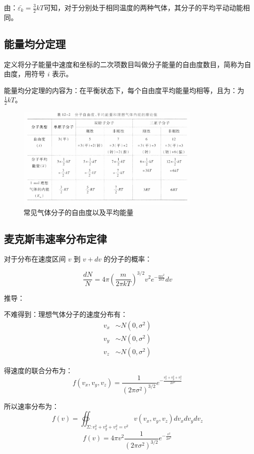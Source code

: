 \documentclass[10pt]{ctexart}
\begin{document}
由：$\bar{\varepsilon_k} = \frac{3}{2} k T$可知，对于分别处于相同温度的两种气体，其分子的平均平动动能相同。

\subsection{能量均分定理}

定义将分子能量中速度和坐标的二次项数目叫做分子能量的自由度数目，简称为自由度，用符号 $i$ 表示。

能量均分定理的内容为：在平衡状态下，每个自由度平均能量均相等，且为：为 $\frac{1}{2} k T$。

\begin{figure}[H]
    \centering
    \includegraphics[width=0.8\textwidth]{img/12/2.png}
    \caption{常见气体分子的自由度以及平均能量}
\end{figure}

\subsection{麦克斯韦速率分布定律}

对于分布在速度区间 $v$ 到 $v + d v$ 的分子的概率：

$$
    \frac{d N}{N} = 4 \pi \left( \frac{m}{2 \pi k T} \right)^{3/2} v^2 e^{-\frac{m v^2}{2 k T}} d v
$$

推导：

不难得到：理想气体分子的速度分布有：
\begin{align*}
    v_x &\sim N(0, \sigma^2) \\
    v_y &\sim N(0, \sigma^2) \\
    v_z &\sim N(0, \sigma^2)
\end{align*}

得速度的联合分布为：
$$
    f(v_x,v_y,v_z) = \frac{1}{(2 \pi \sigma^2)^{3/2}} e^{-\frac{v_x^2 + v_y^2 + v_z^2}{2 \sigma^2}}
$$

所以速率分布为：
$$
    f(v) = \oiint_{\Sigma:v_x^2 + v_y^2 + v_z^2 = v^2} v(v_x,v_y,v_z) d v_x d v_y d v_z
$$
$$
    f(v) = 4\pi v^2 \frac{1}{(2 \pi \sigma^2)^{3/2}} e^{-\frac{v^2}{2 \sigma^2}}
$$
\end{document}
